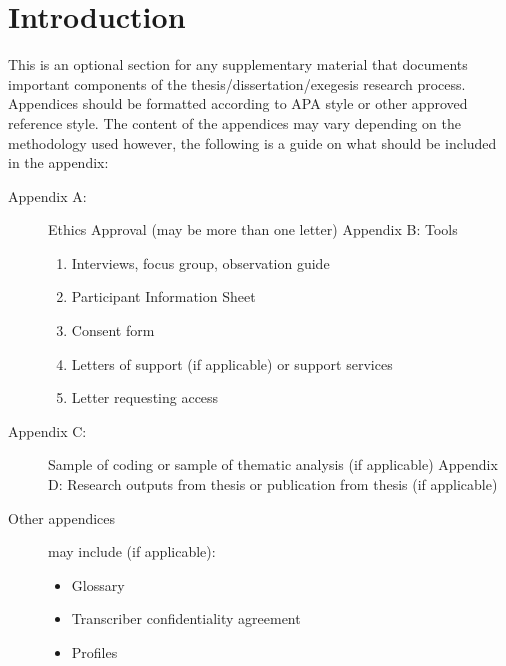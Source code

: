  \label{appendix:1}
\nobreak
\section{Introduction}
\nobreak
This is an optional section for any supplementary material that documents important components of the thesis/dissertation/exegesis research process. Appendices should be formatted according to APA style or other approved reference style.
The content of the appendices may vary depending on the methodology used however, the following is a guide on what should be included in the appendix:
\begin{description}
\item[Appendix A:] Ethics Approval (may be more than one letter) Appendix B: Tools
\begin{enumerate}[label=\alph*)]
\item Interviews, focus group, observation guide
\item Participant Information Sheet
\item Consent form
\item Letters of support (if applicable) or support services
\item Letter requesting access
\end{enumerate}
\item[Appendix C:] Sample of coding or sample of thematic analysis (if applicable) Appendix D: Research outputs from thesis or publication from thesis (if applicable)
\item[Other appendices] may include (if applicable):
\begin{itemize}
\item Glossary
\item Transcriber confidentiality agreement
\item Profiles
\end{itemize}
\end{description}